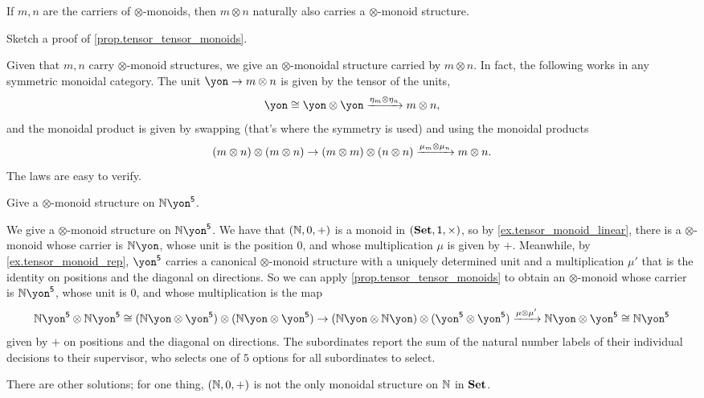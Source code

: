 \documentclass[Book-Poly]{subfiles}
\begin{document}
\begin{proposition}\label{prop.tensor_tensor_monoids}
If $m,n$ are the carriers of $\otimes$-monoids, then $m\otimes n$ naturally also carries a $\otimes$-monoid structure.
\end{proposition}

\begin{exercise}
Sketch a proof of \cref{prop.tensor_tensor_monoids}.
\begin{solution}
Given that $m, n$ carry $\otimes$-monoid structures, we give an $\otimes$-monoidal structure carried by $m\otimes n$.
In fact, the following works in any symmetric monoidal category.
The unit $\yon\to m\otimes n$ is given by the tensor of the units,
\[\yon\cong\yon\otimes\yon\To{\eta_m\otimes\eta_n}m\otimes n,\]
and the monoidal product is given by swapping (that's where the symmetry is used) and using the monoidal products
\[
(m\otimes n)\otimes(m\otimes n)\to (m\otimes m)\otimes(n\otimes n)\xrightarrow{\mu_m\otimes\mu_n}m\otimes n.
\]
The laws are easy to verify.
\end{solution}
\end{exercise}

\begin{exercise}
Give a $\otimes$-monoid structure on $\nn\yon^\5$.
\begin{solution}
We give a $\otimes$-monoid structure on $\nn\yon^\5$.
We have that $(\mathbb{N}, 0, +)$ is a monoid in $(\mathbf{Set}, \textsf{1}, \times)$, so by \cref{ex.tensor_monoid_linear}, there is a $\otimes$-monoid whose carrier is $\nn\yon$, whose unit is the position $0$, and whose multiplication $\mu$ is given by $+$.
Meanwhile, by \cref{ex.tensor_monoid_rep}, $\yon^\5$ carries a canonical $\otimes$-monoid structure with a uniquely determined unit and a multiplication $\mu'$ that is the identity on positions and the diagonal on directions.
So we can apply \cref{prop.tensor_tensor_monoids} to obtain an $\otimes$-monoid whose carrier is $\nn\yon^\5$, whose unit is $0$, and whose multiplication is the map
\[
\nn\yon^\5 \otimes \nn\yon^\5 \iso (\nn\yon \otimes \yon^\5)\otimes(\nn\yon \otimes \yon^\5) \to (\nn\yon \otimes \nn\yon)\otimes(\yon^\5 \otimes \yon^\5) \To{\mu \otimes \mu'} \nn\yon \otimes \yon^\5 \iso \nn\yon^\5
\]
given by $+$ on positions and the diagonal on directions.
The subordinates report the sum of the natural number labels of their individual decisions to their supervisor, who selects one of $5$ options for all subordinates to select.

There are other solutions; for one thing, $(\mathbb{N}, 0, +)$ is not the only monoidal structure on $\mathbb{N}$ in $\mathbf{Set}$.
\end{solution}
\end{exercise}
\end{document}
